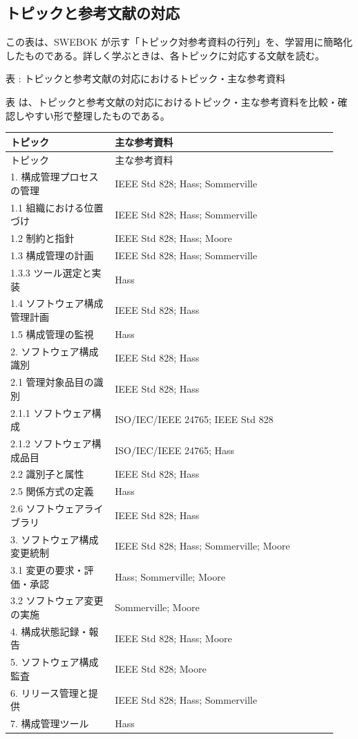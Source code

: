 \subsection*{トピックと参考文献の対応}
この表は、SWEBOK が示す「トピック対参考資料の行列」を、学習用に簡略化したものである。詳しく学ぶときは、各トピックに対応する文献を読む。

\par\smallskip\noindent{}\label{tab:ch08-08}表 \thetable: トピックと参考文献の対応におけるトピック・主な参考資料\par\smallskip
表 \thetable は、トピックと参考文献の対応におけるトピック・主な参考資料を比較・確認しやすい形で整理したものである。\par\smallskip
\begin{longtable}{p{0.30\linewidth}p{0.64\linewidth}}\toprule
トピック & 主な参考資料 \\ \midrule
\endfirsthead\toprule
トピック & 主な参考資料 \\ \midrule
\endhead
1. 構成管理プロセスの管理 & IEEE Std 828; Hass; Sommerville \\
1.1 組織における位置づけ & IEEE Std 828; Hass; Sommerville \\
1.2 制約と指針 & IEEE Std 828; Hass; Moore \\
1.3 構成管理の計画 & IEEE Std 828; Hass; Sommerville \\
1.3.3 ツール選定と実装 & Hass \\
1.4 ソフトウェア構成管理計画 & IEEE Std 828; Hass \\
1.5 構成管理の監視 & Hass \\
2. ソフトウェア構成識別 & IEEE Std 828; Hass \\
2.1 管理対象品目の識別 & IEEE Std 828; Hass \\
2.1.1 ソフトウェア構成 & ISO/IEC/IEEE 24765; IEEE Std 828 \\
2.1.2 ソフトウェア構成品目 & ISO/IEC/IEEE 24765; Hass \\
2.2 識別子と属性 & IEEE Std 828; Hass \\
2.5 関係方式の定義 & Hass \\
2.6 ソフトウェアライブラリ & IEEE Std 828; Hass \\
3. ソフトウェア構成変更統制 & IEEE Std 828; Hass; Sommerville; Moore \\
3.1 変更の要求・評価・承認 & Hass; Sommerville; Moore \\
3.2 ソフトウェア変更の実施 & Sommerville; Moore \\
4. 構成状態記録・報告 & IEEE Std 828; Hass; Moore \\
5. ソフトウェア構成監査 & IEEE Std 828; Moore \\
6. リリース管理と提供 & IEEE Std 828; Hass; Sommerville \\
7. 構成管理ツール & Hass \\
\bottomrule\end{longtable}
